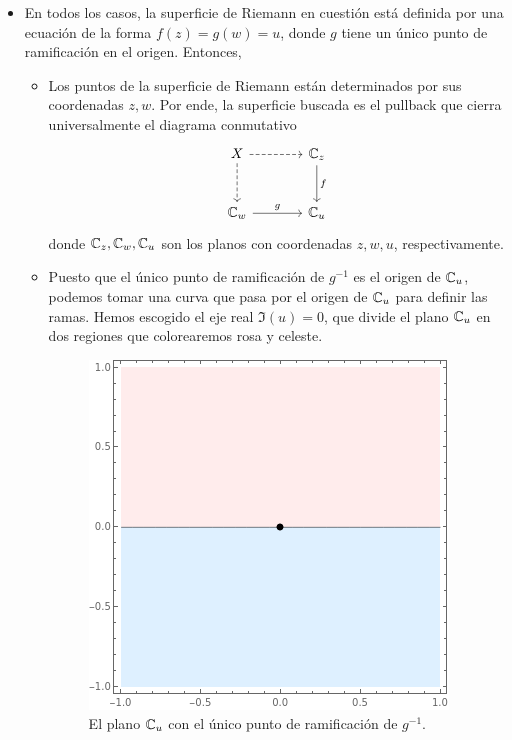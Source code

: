 \begin{solution}
\leavevmode
\begin{itemize}
    \item En todos los casos, la superficie de Riemann en cuestión está definida por una ecuación de la forma $f(z) = g(w) = u$, donde $g$ tiene un único punto de ramificación en el origen. Entonces,
    \begin{itemize}
        \item Los puntos de la superficie de Riemann están determinados por sus coordenadas $z, w$. Por ende, la superficie buscada es el pullback que cierra universalmente el diagrama conmutativo
        $$
        \begin{tikzcd}[row sep=large, column sep=large]
            X \arrow[r, dashed] \arrow[d, dashed] & \C_z \arrow[d, "f"] \\
            \C_w \arrow[r, "g"] & \C_u
        \end{tikzcd}
        $$
        donde $\mathbb C_z, \mathbb C_w, \mathbb C_u$ son los planos con coordenadas $z, w, u$, respectivamente.
        
        \item Puesto que el único punto de ramificación de $g^{-1}$ es el origen de $\mathbb C_u$, podemos tomar una curva que pasa por el origen de $\mathbb C_u$ para definir las ramas. Hemos escogido el eje real $\Im(u) = 0$, que divide el plano $\mathbb C_u$ en dos regiones que colorearemos rosa y celeste.
        \begin{figure}[h]
            \centering
            \includegraphics[scale=0.4]{ramification/0-u.png}
            \caption{El plano $\mathbb C_u$ con el único punto de ramificación de $g^{-1}$.}
        \end{figure}
        

\end{itemize}
\end{itemize}
\end{solution}
